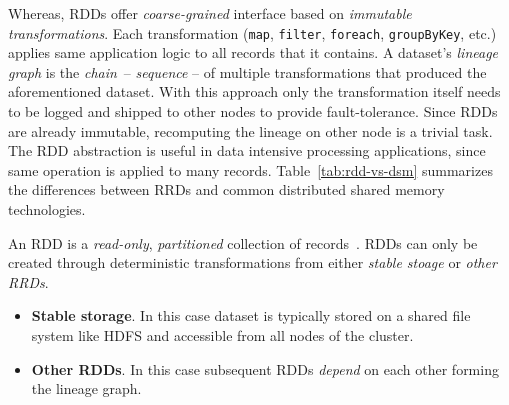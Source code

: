 Whereas, RDDs offer \emph{coarse-grained} interface based on \emph{immutable transformations}. Each transformation (\lstinline$map$, \lstinline$filter$, \lstinline$foreach$, \lstinline$groupByKey$, etc.) applies same application logic to all records that it contains. A dataset's \emph{lineage graph} is the \emph{chain}~-- \emph{sequence} -- of multiple transformations that produced the aforementioned dataset. With this approach only the transformation itself needs to be logged and shipped to other nodes to provide fault-tolerance. Since RDDs are already immutable, recomputing the lineage on other node is a trivial task. The RDD abstraction is useful in data intensive processing applications, since same operation is applied to many records. Table~\ref{tab:rdd-vs-dsm} summarizes the differences between RRDs and common distributed shared memory technologies.

An RDD is a \emph{read-only}, \emph{partitioned} collection of records~\cite{Zaharia:2012}. RDDs can only be created through deterministic transformations from either \emph{stable stoage} or \emph{other RRDs}.
\begin{itemize}
    \item \textbf{Stable storage}. In this case dataset is typically stored on a shared file system like HDFS and accessible from all nodes of the cluster.
    \item \textbf{Other RDDs}. In this case subsequent RDDs \emph{depend} on each other forming the lineage graph.
\end{itemize}

